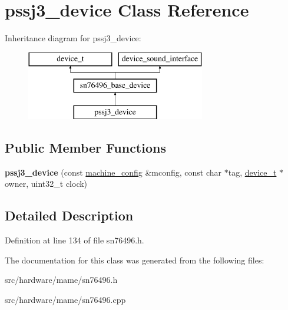 \hypertarget{classpssj3__device}{\section{pssj3\-\_\-device Class Reference}
\label{classpssj3__device}
}
Inheritance diagram for pssj3\-\_\-device\-:\begin{figure}[H]
\begin{center}
\leavevmode
\includegraphics[height=3.000000cm]{classpssj3__device}
\end{center}
\end{figure}
\subsection*{Public Member Functions}
\begin{DoxyCompactItemize}
\item 
\hypertarget{classpssj3__device_a20f70489ac2610e12c81f29d75887c36}{{\bfseries pssj3\-\_\-device} (const \hyperlink{structmachine__config}{machine\-\_\-config} \&mconfig, const char $\ast$tag, \hyperlink{classdevice__t}{device\-\_\-t} $\ast$owner, uint32\-\_\-t clock)}\label{classpssj3__device_a20f70489ac2610e12c81f29d75887c36}

\end{DoxyCompactItemize}


\subsection{Detailed Description}


Definition at line 134 of file sn76496.\-h.



The documentation for this class was generated from the following files\-:\begin{DoxyCompactItemize}
\item 
src/hardware/mame/sn76496.\-h\item 
src/hardware/mame/sn76496.\-cpp\end{DoxyCompactItemize}
